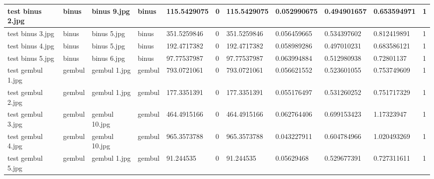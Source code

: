 \begin{landscape}
\begin{longtable}{|p{2cm}|p{1.5cm}|p{2cm}|p{1.5cm}|p{2cm}|p{1cm}|p{2cm}|p{2cm}|p{2cm}|p{2cm}|p{1cm}|}
		test binus 2.jpg     & binus            & binus 9.jpg           & binus                       & 115.5429075           & 0                       & 115.5429075                & 0.052990675           & 0.494901657           & 0.653594971              & 1                \\ \hline
		test binus 3.jpg     & binus            & binus 5.jpg           & binus                       & 351.5259846           & 0                       & 351.5259846                & 0.056459665           & 0.534397602           & 0.812419891              & 1                \\ \hline
		test binus 4.jpg     & binus            & binus 5.jpg           & binus                       & 192.4717382           & 0                       & 192.4717382                & 0.058989286           & 0.497010231           & 0.683586121              & 1                \\ \hline
		test binus 5.jpg     & binus            & binus 6.jpg           & binus                       & 97.77537987           & 0                       & 97.77537987                & 0.063994884           & 0.512980938           & 0.72801137               & 1                \\ \hline
		test gembul 1.jpg    & gembul           & gembul 1.jpg          & gembul                      & 793.0721061           & 0                       & 793.0721061                & 0.056621552           & 0.523601055           & 0.753749609              & 1                \\ \hline
		test gembul 2.jpg    & gembul           & gembul 1.jpg          & gembul                      & 177.3351391           & 0                       & 177.3351391                & 0.055176497           & 0.531260252           & 0.751717329              & 1                \\ \hline
		test gembul 3.jpg    & gembul           & gembul 10.jpg         & gembul                      & 464.4915166           & 0                       & 464.4915166                & 0.062764406           & 0.699153423           & 1.17323947               & 1                \\ \hline
		test gembul 4.jpg    & gembul           & gembul 10.jpg         & gembul                      & 965.3573788           & 0                       & 965.3573788                & 0.043227911           & 0.604784966           & 1.020493269              & 1                \\ \hline
		test gembul 5.jpg    & gembul           & gembul 1.jpg          & gembul                      & 91.244535             & 0                       & 91.244535                  & 0.05629468            & 0.529677391           & 0.727311611              & 1                \\ \hline

\end{longtable}
\end{landscape}
